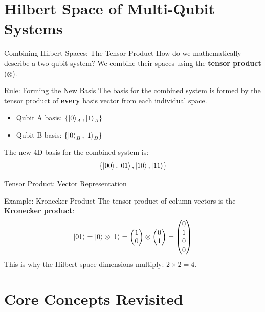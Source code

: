 \documentclass{beamer}
\begin{document}
\section{Hilbert Space of Multi-Qubit Systems}
\begin{frame}[fragile]{Combining Hilbert Spaces: The Tensor Product}
    How do we mathematically describe a two-qubit system? We combine their spaces using the \textbf{tensor product} ($\otimes$).

    \begin{block}{Rule: Forming the New Basis}
        The basis for the combined system is formed by the tensor product of \textbf{every} basis vector from each individual space.
        \begin{itemize}
            \item Qubit A basis: $\{ \ket{0}_A, \ket{1}_A \}$
            \item Qubit B basis: $\{ \ket{0}_B, \ket{1}_B \}$
        \end{itemize}
        
        The new 4D basis for the combined system is:
        \[ \{ \ket{00}, \ket{01}, \ket{10}, \ket{11} \} \]
    \end{block}
\end{frame}

\begin{frame}[fragile]{Tensor Product: Vector Representation}
    \begin{block}{Example: Kronecker Product}
        The tensor product of column vectors is the \textbf{Kronecker product}:
        \[
        \ket{01} = \ket{0} \otimes \ket{1} = \begin{pmatrix} 1 \\ 0 \end{pmatrix} \otimes \begin{pmatrix} 0 \\ 1 \end{pmatrix} = \begin{pmatrix} 0 \\ 1 \\ 0 \\ 0 \end{pmatrix}
        \]
        This is why the Hilbert space dimensions multiply: $2 \times 2 = 4$.
    \end{block}
\end{frame}

\section{Core Concepts Revisited}
\end{document}
